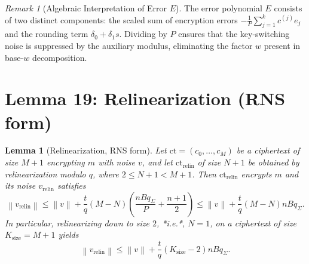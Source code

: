 \documentclass[11pt]{article}
\newtheorem{lemma}{Lemma}
\theoremstyle{definition}
\theoremstyle{remark}
\newtheorem{remark}{Remark}
\newcommand{\norm}[1]{\left\lVert #1\right\rVert}
\newcommand{\ct}{\mathrm{ct}}
\newcommand{\ctrelin}{\mathrm{ct}_{\mathrm{relin}}}
\newcommand{\vrelin}{v_{\mathrm{relin}}}
\begin{document}
\begin{remark}[Algebraic Interpretation of Error $E$]
The error polynomial $E$ consists of two distinct components: the scaled sum of encryption errors $-\frac{1}{P}\sum_{j=1}^k c^{(j)} e_j$ and the rounding term $\delta_0 + \delta_1 s$.
Dividing by $P$ ensures that the key-switching noise is suppressed by the auxiliary modulus, eliminating the factor $w$ present in base-$w$ decomposition.
\end{remark}

\section*{Lemma 19: Relinearization (RNS form)}

\begin{lemma}[Relinearization, RNS form]\label{lem:relin}
Let $\ct = (c_0, \dots, c_M)$ be a ciphertext of size $M+1$ encrypting $m$ with noise $v$, and let $\ctrelin$ of size $N+1$ be obtained by relinearization modulo $q$, where $2 \leq N+1 < M+1$.
Then $\ctrelin$ encrypts $m$ and its noise $\vrelin$ satisfies
\[
  \norm{\vrelin} \leq \norm{v} + \frac{t}{q}(M-N)\left(\frac{n B q_\Sigma}{P} + \frac{n+1}{2}\right) \leq \norm{v} + \frac{t}{q}(M-N) n B q_\Sigma.
\]
In particular, relinearizing down to size $2$, *i.e.*, $N=1$, on a ciphertext of size $K_{\mathrm{size}} = M+1$ yields
\[
  \norm{\vrelin} \leq \norm{v} + \frac{t}{q}(K_{\mathrm{size}}-2) n B q_\Sigma.
\]
\end{lemma}
\end{document}

